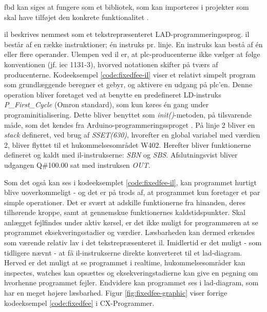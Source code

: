 
\noindent \gls{fbd} kan siges at fungere som et bibliotek, som kan importeres i projekter som skal have tilføjet den konkrete funktionalitet \cite{FDB_desc}.

\label{subsec:il-pa}
\gls{il} beskrives nemmest som et tekstrepræsenteret LAD-programmeringssprog. \gls{il} består af en række instruktioner; én instruks pr. linje. En instruks kan bestå af én eller flere operander. Ulempen ved \gls{il} er, at \gls{plc}-producenterne ikke vælger at følge konventionen (jf. \gls{iec} 1131-3), hvorved notationen skifter på tværs af producenterne. Kodeeksempel \ref{code:fixedfee-il} viser et relativt simpelt program som grundlæggende beregner et gebyr, og aktivere en udgang på \gls{plc}'en. Denne operation bliver foretaget ved at benytte en predefineret LD-instruks \textit{P\_First\_Cycle} (Omron standard), som kun køres én gang under programinitialisering. Dette bliver benyttet som \textit{init()}-metoden, på tilsvarende måde, som det kendes fra Arduino-programmeringssproget \cite{ardiono_code_init}. På linje 2 bliver en \textit{stack} defineret, ved brug af \textit{SSET(630)}, hvorefter en global variabel med værdien 2, bliver flyttet til et hukommelsesområdet W402. Herefter bliver funktionerne defineret og kaldt med \gls{il}-instrukserne: \textit{SBN} og \textit{SBS}. Afslutningsvist bliver udgangen Q\#100.00 sat med instruksen \textit{OUT}. 


\noindent Som det også kan ses i kodeeksemplet \ref{code:fixedfee-il}, kan programmet hurtigt blive uoverkommeligt - og det er på trods af, at programmet kun foretager et par simple operationer. Det er svært at adskille funktionerne fra hinanden, deres tilhørende kroppe, samt at gennemskue funktionernes kaldstidspunkter. Skal anlægget fejlfindes under aktiv kørsel, er det ikke muligt for programmøren at se programmet eksekveringsstadier og værdier. Læsbarheden kan dermed erkendes som værende relativ lav i det tekstrepræsenteret \gls{il}. Imidlertid er det muligt - som tidligere nævnt - at få \gls{il}-instrukserne direkte konverteret til et \gls{lad}-diagram. Herved er det muligt at se programmet i realtime, hukommelsesområder kan inspectes, watches kan opsættes og eksekveringstadierne kan give en pegning om hvorhenne programmet fejler. Endvidere kan programmet ses i \gls{lad}-diagram, som har en meget højere læsbarhed. Figur \ref{fig:fixedfee-graphic} viser forrige kodeeksempel \ref{code:fixedfee} i CX-Programmer.


